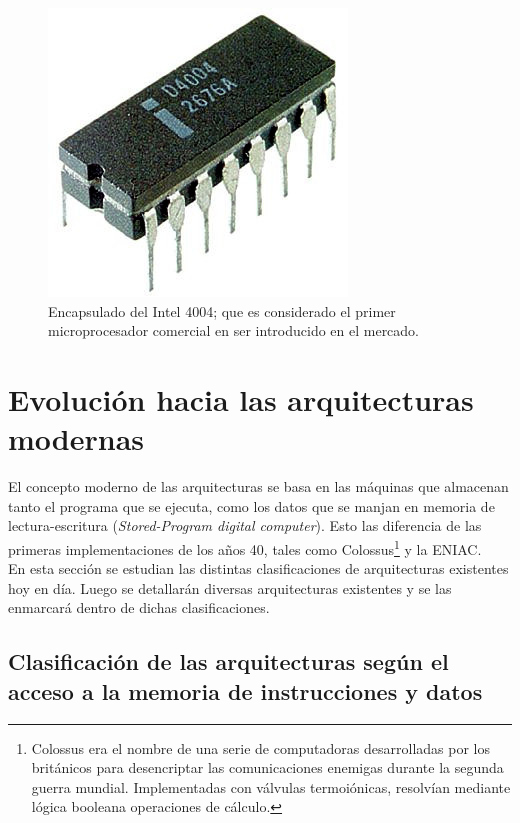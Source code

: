 \begin{figure}
  \centering
  \includegraphics[scale=0.5]{./figures/C02-intel_4004}
  \captionsetup{justification=centering}
  \caption{Encapsulado del Intel 4004; que es considerado el primer
    microprocesador comercial en ser introducido en el mercado.}
  \label{fig:C02-intel_4004}
\end{figure}

\section{Evolución hacia las arquitecturas modernas}
\label{sec:theory-modern}

El concepto moderno de las arquitecturas se basa en las máquinas que almacenan
tanto el programa que se ejecuta, como los datos que se manjan en memoria de
lectura-escritura (\emph{Stored-Program digital computer}). Esto las diferencia
de las primeras implementaciones de los años 40, tales como
Colossus\footnote{Colossus era el nombre de una serie de computadoras
desarrolladas por los británicos para desencriptar las comunicaciones enemigas
durante la segunda guerra mundial. Implementadas con válvulas termoiónicas,
resolvían mediante lógica booleana operaciones de cálculo.} y la ENIAC.\\
En esta sección se estudian las distintas clasificaciones de arquitecturas
existentes hoy en día. Luego se detallarán diversas arquitecturas existentes y
se las enmarcará dentro de dichas clasificaciones.

\subsection{Clasificación de las arquitecturas según el acceso a la memoria de 
instrucciones y datos}
\label{subsec:theory-modern-memory_access}

